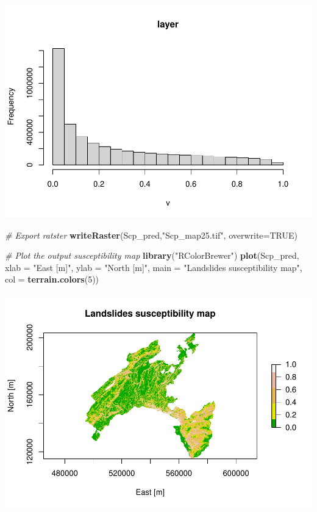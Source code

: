 \documentclass[
]{book}
\newenvironment{Shaded}{\begin{snugshade}}{\end{snugshade}}
\newcommand{\AttributeTok}[1]{\textcolor[rgb]{0.13,0.29,0.53}{#1}}
\newcommand{\CommentTok}[1]{\textcolor[rgb]{0.56,0.35,0.01}{\textit{#1}}}
\newcommand{\ConstantTok}[1]{\textcolor[rgb]{0.56,0.35,0.01}{#1}}
\newcommand{\DecValTok}[1]{\textcolor[rgb]{0.00,0.00,0.81}{#1}}
\newcommand{\FunctionTok}[1]{\textcolor[rgb]{0.13,0.29,0.53}{\textbf{#1}}}
\newcommand{\NormalTok}[1]{#1}
\newcommand{\StringTok}[1]{\textcolor[rgb]{0.31,0.60,0.02}{#1}}
\begin{document}
\includegraphics{06-RF_files/figure-latex/Scp-map-1.pdf}

\begin{Shaded}
\begin{Highlighting}[]
\CommentTok{\# Export ratster}
\FunctionTok{writeRaster}\NormalTok{(Scp\_pred,}\StringTok{"Scp\_map25.tif"}\NormalTok{, }\AttributeTok{overwrite=}\ConstantTok{TRUE}\NormalTok{)}

\CommentTok{\# Plot the output susceptibility map}
\FunctionTok{library}\NormalTok{(}\StringTok{"RColorBrewer"}\NormalTok{)}
\FunctionTok{plot}\NormalTok{(Scp\_pred, }\AttributeTok{xlab =} \StringTok{"East [m]"}\NormalTok{, }\AttributeTok{ylab =} \StringTok{"North [m]"}\NormalTok{, }
     \AttributeTok{main =} \StringTok{"Landslides susceptibility map"}\NormalTok{, }
     \AttributeTok{col =} \FunctionTok{terrain.colors}\NormalTok{(}\DecValTok{5}\NormalTok{))}
\end{Highlighting}
\end{Shaded}

\includegraphics{06-RF_files/figure-latex/Scp-map-2.pdf}
\end{document}
